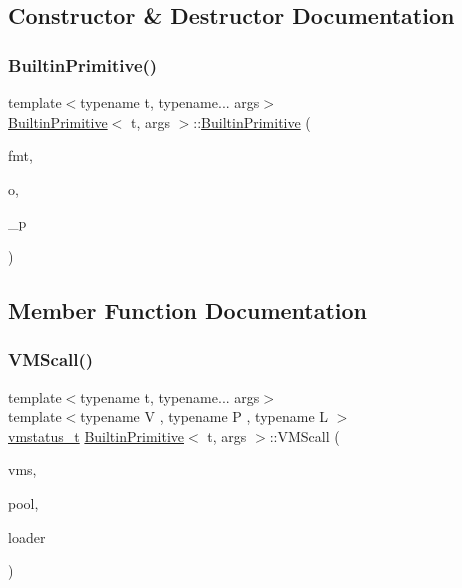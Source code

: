 \subsection{Constructor \& Destructor Documentation}
\mbox{\label{struct_builtin_primitive_abad30dd239c26d27a2e6f1658aff9182}} 
\subsubsection{\texorpdfstring{Builtin\+Primitive()}{BuiltinPrimitive()}}
{\footnotesize\ttfamily template$<$typename t, typename... args$>$ \\
\hyperlink{struct_builtin_primitive}{Builtin\+Primitive}$<$ t, args $>$\+::\hyperlink{struct_builtin_primitive}{Builtin\+Primitive} (\begin{DoxyParamCaption}\item[{std\+::string}]{fmt,  }\item[{\hyperlink{_instruction_8h_af2fb7c87c5854c5733d7bb0506b06de7}{Builtin\+Op}}]{o,  }\item[{double}]{\+\_\+p }\end{DoxyParamCaption})\hspace{0.3cm}{\ttfamily [inline]}}



\subsection{Member Function Documentation}
\mbox{\label{struct_builtin_primitive_a6403ebb7076028fa99751436768d6d81}} 
\subsubsection{\texorpdfstring{V\+M\+Scall()}{VMScall()}}
{\footnotesize\ttfamily template$<$typename t, typename... args$>$ \\
template$<$typename V , typename P , typename L $>$ \\
\hyperlink{_instruction_8h_a6202215407ab29590bb936ca2996cf64}{vmstatus\+\_\+t} \hyperlink{struct_builtin_primitive}{Builtin\+Primitive}$<$ t, args $>$\+::V\+M\+Scall (\begin{DoxyParamCaption}\item[{V $\ast$}]{vms,  }\item[{P $\ast$}]{pool,  }\item[{L $\ast$}]{loader }\end{DoxyParamCaption})\hspace{0.3cm}{\ttfamily [inline]}}



